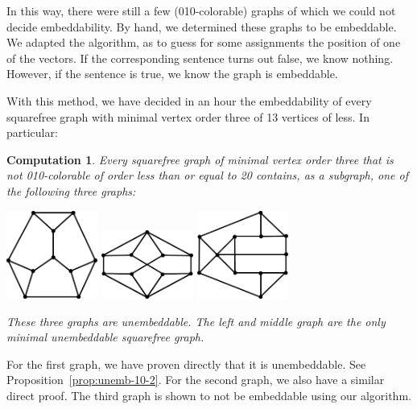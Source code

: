 \documentclass[adraft,copyright,creativecommons]{eptcs}
\newcounter{main}
\newtheorem{comp}[main]{Computation}
\theoremstyle{definition}
\theoremstyle{remark}
\begin{document}
In this way, there were still a few (010-colorable) graphs of which
we could not decide embeddability.
By hand, we determined these graphs to be embeddable.
We adapted the algorithm, as to guess
for some assignments the position of one of the vectors.
If the corresponding
sentence turns out false, we know nothing.  However,
if the sentence is true, we know the graph is embeddable.

With this method, we have decided in an hour the embeddability
of every squarefree graph with minimal vertex order three of 13
vertices of less.
In particular:
\begin{comp}\label{comp:unemb20}
    Every squarefree graph of minimal vertex order three
    that is not 010-colorable
    of order less than or equal to 20
    contains, as a subgraph, one of the following three graphs:
    \begin{center}
        \includegraphics[width=30mm]{../graphs/unemb10-1.pdf} \qquad
        \includegraphics[width=30mm]{../graphs/unemb10-2.pdf} \qquad
        \includegraphics[width=30mm]{../graphs/unemb10-3.pdf}
    \end{center}
    These three graphs are unembeddable.  The left and middle graph
    are the only minimal unembeddable squarefree graph.
\end{comp}
For the first graph, we have proven directly that it is unembeddable.
See Proposition~\ref{prop:unemb-10-2}.
For the second graph, we also have a similar direct proof. The third graph is shown to not be embeddable using our algorithm.
\end{document}
